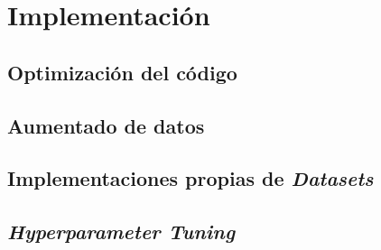 \chapter{Implementación} \label{ich:implementacion}

\section{Optimización del código} \label{isec:optimizacion_codigo}

\section{Aumentado de datos} \label{isec:aumentado_datos}

\section{Implementaciones propias de \textit{Datasets}} \label{isec:datasets_customs}

\section{\textit{Hyperparameter Tuning}}
